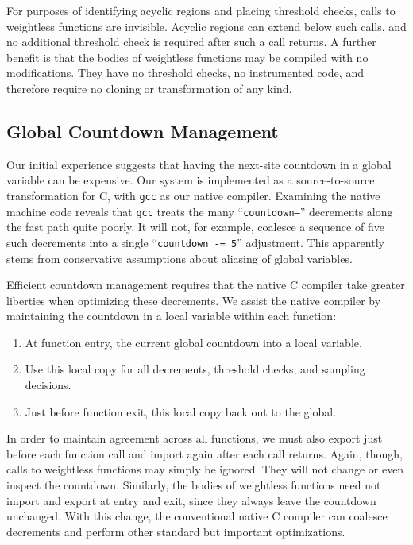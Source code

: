 For purposes of identifying acyclic regions and placing threshold
checks, calls to weightless functions are invisible.  Acyclic regions
can extend below such calls, and no additional threshold check is
required after such a call returns.  A further benefit is that the
bodies of weightless functions may be compiled with no modifications.
They have no threshold checks, no instrumented code, and therefore
require no cloning or transformation of any kind.

\subsection{Global Countdown Management}

Our initial experience suggests that having the next-site countdown in
a global variable can be expensive.  Our system is implemented as a
source-to-source transformation for C, with \texttt{gcc} as our native
compiler.  Examining the native machine code reveals that \texttt{gcc}
treats the many ``\texttt{countdown--}'' decrements along the fast
path quite poorly.  It will not, for example, coalesce a sequence of
five such decrements into a single ``\texttt{countdown -= 5}''
adjustment.  This apparently stems from conservative assumptions about
aliasing of global variables.

Efficient countdown management requires that the native C compiler
take greater liberties when optimizing these decrements.  We assist
the native compiler by maintaining the countdown in a local variable
within each function:

\begin{enumerate}
\item At function entry,  the current global countdown
  into a local variable.
\item Use this local copy for all decrements, threshold checks, and
  sampling decisions.
\item Just before function exit,  this local copy back
  out to the global.
\end{enumerate}

In order to maintain agreement across all functions, we must also
export just before each function call and import again after each call
returns.  Again, though, calls to weightless functions may simply be
ignored.  They will not change or even inspect the countdown.
Similarly, the bodies of weightless functions need not import and
export at entry and exit, since they always leave the countdown
unchanged.  With this change, the conventional native C compiler can
coalesce decrements and perform other standard but important
optimizations.
